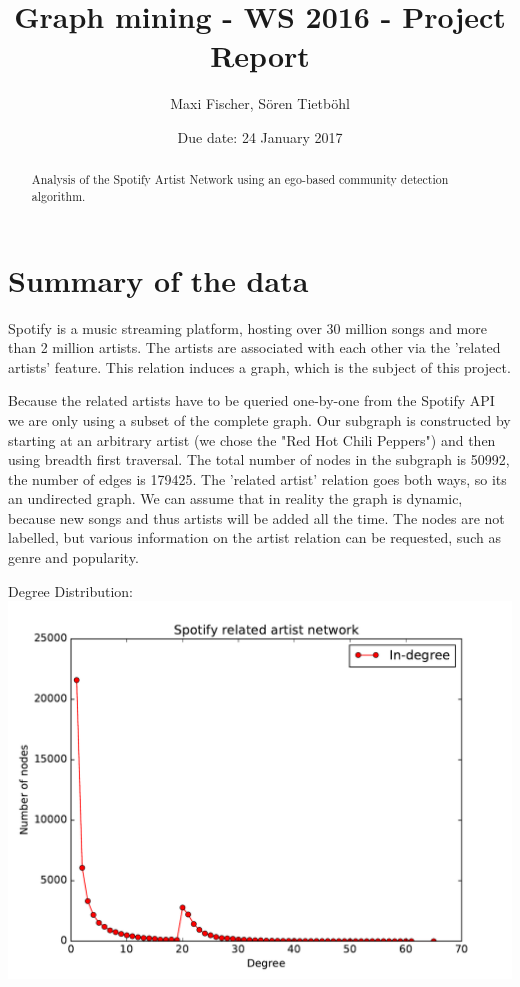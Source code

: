 \documentclass[11pt,a4paper,onecolumn,notitlepage]{article}
\begin{document}
\title{Graph mining - WS 2016 - Project Report}




\date{Due date: 24 January 2017}

\author{
Maxi Fischer, S\"oren Tietb\"ohl\\ 
}


\maketitle



\begin{abstract}
Analysis of the Spotify Artist Network using an ego-based community detection algorithm.
\end{abstract}


\section{Summary of the data}

Spotify is a music streaming platform, hosting over 30 million songs and more than 2 million artists. The artists are associated with each other via the 'related artists' feature. This relation induces a graph, which is the subject of this project.

Because the related artists have to be queried one-by-one from the Spotify API we are only using a subset of the complete graph. Our subgraph is constructed by starting at an arbitrary artist (we chose the "Red Hot Chili Peppers") and then using breadth first traversal. The total number of nodes in the subgraph is 50992, the number of edges is 179425. The 'related artist' relation goes both ways, so its an undirected graph. We can assume that in reality the graph is dynamic, because new songs and thus artists will be added all the time. The nodes are not labelled, but various information on the artist relation can be requested, such as genre and popularity.

Degree Distribution: 
\includegraphics[scale=0.4]{spotify_degree_distribution.pdf}
\end{document}
